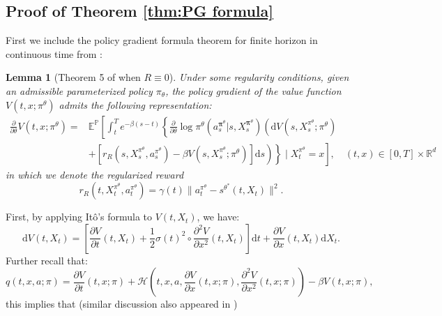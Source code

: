 \documentclass{article}
\theoremstyle{plain}
\newtheorem{lemma}[theorem]{Lemma}
\theoremstyle{definition}
\theoremstyle{remark}
\begin{document}
\subsection{Proof of Theorem \ref{thm:PG formula}}
\label{Proof of PG formula}
First we include the policy gradient formula theorem for finite horizon in continuous time from \cite{jia2022policy_gradient}:
\begin{lemma}[Theorem 5 of \cite{jia2022policy_gradient} when $R\equiv 0$]
\label{thm:Jia&Zhou PG}
Under some regularity conditions, given an admissible parameterized policy $\pi_{\theta}$, the policy gradient of the value function $V\left(t, x ; \pi^\theta\right)$ admits the following representation:
\begin{equation}
\label{eqn:Jia&Zhou PG}
\begin{aligned}
\frac{\partial}{\partial \theta} V(t, x ; \pi^\theta)= & \mathbb{E}^{\mathbb{P}}\left[\int _ { t } ^ { T } e ^ { - \beta ( s - t ) } \left\{\frac { \partial } { \partial \theta} \operatorname { l o g } \pi^ { \theta} ( a _ { s } ^ { \boldsymbol { \pi } ^ {\theta} } | s , X _ { s } ^ { \boldsymbol { \pi } ^ {\theta} } ) \left(\mathrm{d} V(s, X_s^{\pi^\theta} ; \pi^\theta)\right.\right.\right. \\
& \left.\left.\left.+\left[r_R(s, X_s^{\pi^\theta}, a_s^{\pi^\theta})-\beta V(s, X_s^{\pi^\theta} ; \pi^\theta)\right] \mathrm{d} s\right) \right\} \mid X_t^{\pi^\theta}=x\right], \quad(t, x) \in[0, T] \times \mathbb{R}^d
\end{aligned}
\end{equation}
in which we denote the regularized reward
$$
r_R(t, X_t^{\pi^\theta}, a_t^{\pi^\theta}) = \gamma(t) \|a_t^{\pi^\theta}-s^{\theta^{*}}(t,X_t)\|^2.
$$
\end{lemma}
First, by applying It\^o's formula to $V(t,X_t)$, we have:
\begin{equation}
\mathrm{d}V(t,X_t) = \left[\frac{\partial V}{\partial t}(t,X_t)+\frac{1}{2}\sigma(t)^2\circ\frac{\partial^2 V}{\partial x^2}(t,X_t)\right]\mathrm{d}t+\frac{\partial V}{\partial x}(t,X_t)\mathrm{d}X_t.
\end{equation}
Further recall that:
\begin{equation}
q(t, x, a ; \pi)=\frac{\partial V}{\partial t}\left(t, x ; \pi\right)+\mathcal{H}\left(t, x, a, \frac{\partial V}{\partial x}\left(t,x ; \pi\right), \frac{\partial^2 V}{\partial x^2}\left(t,x ; \pi\right)\right)-\beta V\left(t,x ; \pi\right),
\end{equation}
this implies that (similar discussion also appeared in \cite{jia2022q_learning})
\end{document}
